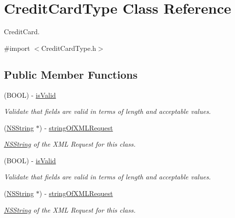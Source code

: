 \hypertarget{interface_credit_card_type}{
\section{CreditCardType Class Reference}
\label{interface_credit_card_type}
}


CreditCard.  




{\ttfamily \#import $<$CreditCardType.h$>$}

\subsection*{Public Member Functions}
\begin{DoxyCompactItemize}
\item 
(BOOL) -\/ \hyperlink{interface_credit_card_type_a201c09b0a84634ed5e015d3b20e20d42}{isValid}
\begin{DoxyCompactList}\small\item\em Validate that fields are valid in terms of length and acceptable values. \item\end{DoxyCompactList}\item 
(\hyperlink{class_n_s_string}{NSString} $\ast$) -\/ \hyperlink{interface_credit_card_type_aff6e2d3e9e56f3ede8deb567417072c8}{stringOfXMLRequest}
\begin{DoxyCompactList}\small\item\em \hyperlink{class_n_s_string}{NSString} of the XML Request for this class. \item\end{DoxyCompactList}\item 
(BOOL) -\/ \hyperlink{interface_credit_card_type_a201c09b0a84634ed5e015d3b20e20d42}{isValid}
\begin{DoxyCompactList}\small\item\em Validate that fields are valid in terms of length and acceptable values. \item\end{DoxyCompactList}\item 
(\hyperlink{class_n_s_string}{NSString} $\ast$) -\/ \hyperlink{interface_credit_card_type_aff6e2d3e9e56f3ede8deb567417072c8}{stringOfXMLRequest}
\begin{DoxyCompactList}\small\item\em \hyperlink{class_n_s_string}{NSString} of the XML Request for this class. \item\end{DoxyCompactList}\item 

\end{DoxyCompactItemize}
